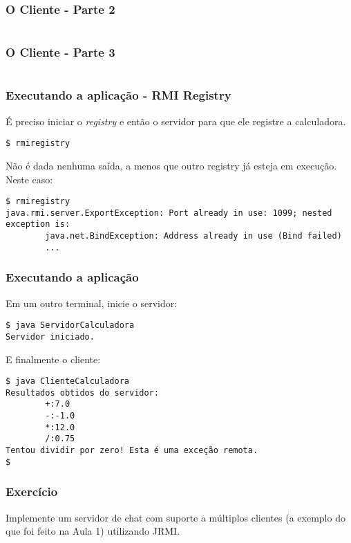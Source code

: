 \documentclass[Ligatures=TeX,table,brazil,svgnames,usetotalslideindicator,comp
ress,10pt]{beamer}
\begin{document}
\begin{frame}
  \frametitle{O Cliente - Parte 2}
  {\footnotesize
    \inputminted[linenos, firstline=16,
    lastline=27]{java}{Codigo/Aula02/ClienteCalculadora.java}
  }
\end{frame}

\begin{frame}
  \frametitle{O Cliente - Parte 3}
  {\footnotesize
    \inputminted[linenos, firstline=29]
    {java}{Codigo/Aula02/ClienteCalculadora.java}
  }
\end{frame}

\begin{frame}[fragile]
  \frametitle{Executando a aplicação - RMI Registry}

  É preciso iniciar o \emph{registry} e então o servidor para que ele
  registre a calculadora.

\begin{verbatim}
$ rmiregistry

\end{verbatim}

Não é dada nenhuma saída, a menos que outro registry já esteja em execução. Neste caso:
{\footnotesize
\begin{verbatim}
$ rmiregistry
java.rmi.server.ExportException: Port already in use: 1099; nested exception is:
        java.net.BindException: Address already in use (Bind failed)
        ...
\end{verbatim}
}
\end{frame}

\begin{frame}[fragile]
  \frametitle{Executando a aplicação}

  Em um outro terminal, inicie o servidor:

\begin{verbatim}
$ java ServidorCalculadora
Servidor iniciado.

\end{verbatim}

E finalmente o cliente:

\begin{verbatim}
$ java ClienteCalculadora
Resultados obtidos do servidor:
        +:7.0
        -:-1.0
        *:12.0
        /:0.75
Tentou dividir por zero! Esta é uma exceção remota.
$
\end{verbatim}

\end{frame}

\begin{frame}
  \frametitle{Exercício}

  Implemente um servidor de chat com suporte a múltiplos clientes (a
  exemplo do que foi feito na Aula 1) utilizando JRMI.

\end{frame}
\end{document}
